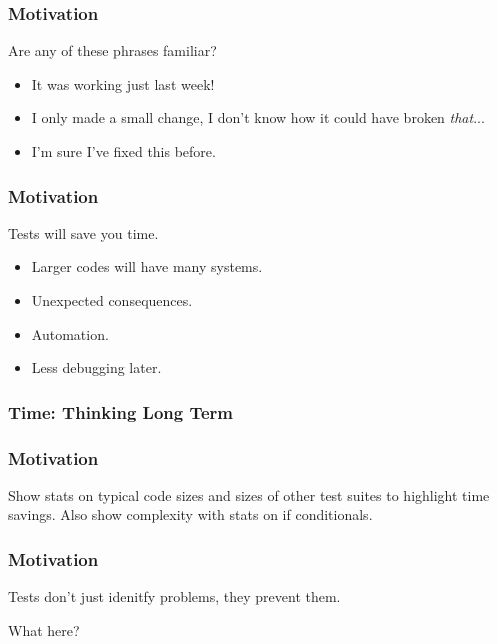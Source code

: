 \begin{frame}
  \frametitle{Motivation}
  Are any of these phrases familiar?
  \begin{itemize}
    \pause
    \item It was working just last week!
    \pause
    \item I only made a small change, I don't know how it could have broken \emph{that}...
    \pause
    \item I'm sure I've fixed this before.
  \end{itemize}
\end{frame}

\begin{frame}
  \frametitle{Motivation}
  Tests will save you time.
  \begin{itemize}
    \item Larger codes will have many systems.
    \item Unexpected consequences.
    \item Automation.
    \item Less debugging later.
  \end{itemize}
\end{frame}

\begin{frame}
  \frametitle{Time: Thinking Long Term}
\end{frame}

\begin{frame}
  \frametitle{Motivation}
  Show stats on typical code sizes and sizes of other test suites to highlight
  time savings. Also show complexity with stats on if conditionals.
\end{frame}

\begin{frame}
  \frametitle{Motivation}
  Tests don't just idenitfy problems, they prevent them.

  What here?
\end{frame}

